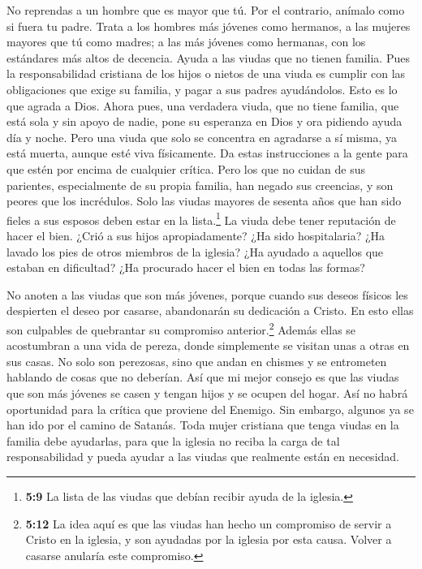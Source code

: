  No reprendas a un hombre que es mayor que tú. Por el
contrario, anímalo como si fuera tu padre. Trata a los hombres más
jóvenes como hermanos,  a las mujeres mayores que tú como
madres; a las más jóvenes como hermanas, con los estándares más altos de
decencia.  Ayuda a las viudas que no tienen familia.
 Pues la responsabilidad cristiana de los hijos o nietos de
una viuda es cumplir con las obligaciones que exige su familia, y pagar
a sus padres ayudándolos. Esto es lo que agrada a Dios. 
Ahora pues, una verdadera viuda, que no tiene familia, que está sola y
sin apoyo de nadie, pone su esperanza en Dios y ora pidiendo ayuda día y
noche.  Pero una viuda que solo se concentra en agradarse a
sí misma, ya está muerta, aunque esté viva físicamente.  Da
estas instrucciones a la gente para que estén por encima de cualquier
crítica.  Pero los que no cuidan de sus parientes,
especialmente de su propia familia, han negado sus creencias, y son
peores que los incrédulos.  Solo las viudas mayores de
sesenta años que han sido fieles a sus esposos deben estar en la
lista.\footnote{\textbf{5:9} La lista de las viudas que debían recibir
  ayuda de la iglesia.}  La viuda debe tener reputación de
hacer el bien. ¿Crió a sus hijos apropiadamente? ¿Ha sido hospitalaria?
¿Ha lavado los pies de otros miembros de la iglesia? ¿Ha ayudado a
aquellos que estaban en dificultad? ¿Ha procurado hacer el bien en todas
las formas?

 No anoten a las viudas que son más jóvenes, porque cuando
sus deseos físicos les despierten el deseo por casarse, abandonarán su
dedicación a Cristo.  En esto ellas son culpables de
quebrantar su compromiso anterior.\footnote{\textbf{5:12} La idea aquí
  es que las viudas han hecho un compromiso de servir a Cristo en la
  iglesia, y son ayudadas por la iglesia por esta causa. Volver a
  casarse anularía este compromiso.}  Además ellas se
acostumbran a una vida de pereza, donde simplemente se visitan unas a
otras en sus casas. No solo son perezosas, sino que andan en chismes y
se entrometen hablando de cosas que no deberían.  Así que
mi mejor consejo es que las viudas que son más jóvenes se casen y tengan
hijos y se ocupen del hogar. Así no habrá oportunidad para la crítica
que proviene del Enemigo.  Sin embargo, algunos ya se han
ido por el camino de Satanás.  Toda mujer cristiana que
tenga viudas en la familia debe ayudarlas, para que la iglesia no reciba
la carga de tal responsabilidad y pueda ayudar a las viudas que
realmente están en necesidad.

